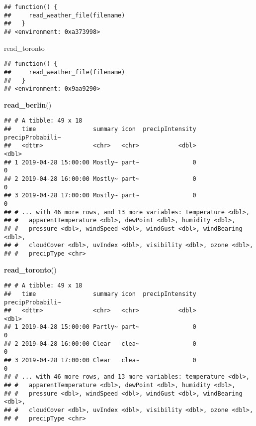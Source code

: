 \documentclass[]{book}
\newenvironment{Shaded}{\begin{snugshade}}{\end{snugshade}}
\newcommand{\KeywordTok}[1]{\textcolor[rgb]{0.13,0.29,0.53}{\textbf{#1}}}
\newcommand{\NormalTok}[1]{#1}
\begin{document}
\begin{verbatim}
## function() {
##     read_weather_file(filename)
##   }
## <environment: 0xa373998>
\end{verbatim}

\begin{Shaded}
\begin{Highlighting}[]
\NormalTok{read_toronto}
\end{Highlighting}
\end{Shaded}

\begin{verbatim}
## function() {
##     read_weather_file(filename)
##   }
## <environment: 0x9aa9290>
\end{verbatim}

\begin{Shaded}
\begin{Highlighting}[]
\KeywordTok{read_berlin}\NormalTok{()}
\end{Highlighting}
\end{Shaded}

\begin{verbatim}
## # A tibble: 49 x 18
##   time                summary icon  precipIntensity precipProbabili~
##   <dttm>              <chr>   <chr>           <dbl>            <dbl>
## 1 2019-04-28 15:00:00 Mostly~ part~               0                0
## 2 2019-04-28 16:00:00 Mostly~ part~               0                0
## 3 2019-04-28 17:00:00 Mostly~ part~               0                0
## # ... with 46 more rows, and 13 more variables: temperature <dbl>,
## #   apparentTemperature <dbl>, dewPoint <dbl>, humidity <dbl>,
## #   pressure <dbl>, windSpeed <dbl>, windGust <dbl>, windBearing <dbl>,
## #   cloudCover <dbl>, uvIndex <dbl>, visibility <dbl>, ozone <dbl>,
## #   precipType <chr>
\end{verbatim}

\begin{Shaded}
\begin{Highlighting}[]
\KeywordTok{read_toronto}\NormalTok{()}
\end{Highlighting}
\end{Shaded}

\begin{verbatim}
## # A tibble: 49 x 18
##   time                summary icon  precipIntensity precipProbabili~
##   <dttm>              <chr>   <chr>           <dbl>            <dbl>
## 1 2019-04-28 15:00:00 Partly~ part~               0                0
## 2 2019-04-28 16:00:00 Clear   clea~               0                0
## 3 2019-04-28 17:00:00 Clear   clea~               0                0
## # ... with 46 more rows, and 13 more variables: temperature <dbl>,
## #   apparentTemperature <dbl>, dewPoint <dbl>, humidity <dbl>,
## #   pressure <dbl>, windSpeed <dbl>, windGust <dbl>, windBearing <dbl>,
## #   cloudCover <dbl>, uvIndex <dbl>, visibility <dbl>, ozone <dbl>,
## #   precipType <chr>
\end{verbatim}
\end{document}
